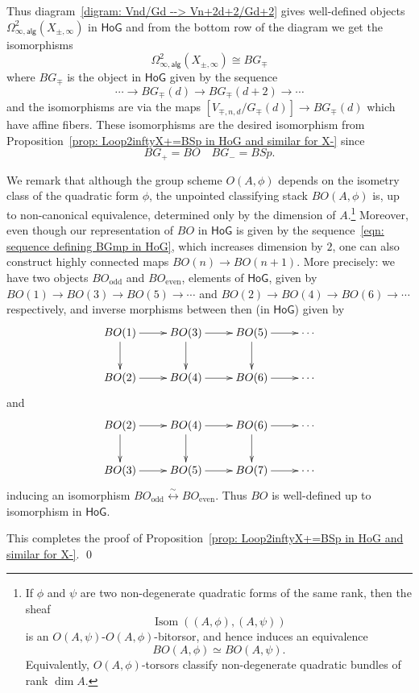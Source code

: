 \documentclass{amsart}
\theoremstyle{definition}
\newcommand{\kk} {{\mathbbm k}}
\newcommand{\HoG}{\textsf{HoG}}
\newcommand{\Isom}{\operatorname{Isom}}
\newcommand{\alg}{\mathsf{alg}}
\begin{document}
Thus diagram~\eqref{digram: Vnd/Gd --> Vn+2d+2/Gd+2} gives
well-defined objects $\Omega^{2}_{\infty ,\alg }(X_{\pm 
,\infty})$ in $\HoG$ and from the bottom row of the diagram we get the
isomorphisms
\[
\Omega^{2}_{\infty ,\alg }(X_{\pm,\infty}) \cong BG_{\mp} 
\]
where $BG_{\mp}$ is the object in $\HoG$ given by the sequence
\begin{equation}\label{eqn: sequence defining BGmp in HoG}
\dotsb \to BG_{\mp}(d)\to BG_{\mp}(d+2) \to \dotsb 
\end{equation}
and the isomorphisms are via the maps $\left[V_{\mp ,n,d}/G_{\mp}(d)
\right]\to BG_{\mp}(d)$ which have affine fibers. These isomorphisms
are the desired isomorphism from Proposition~\ref{prop:
Loop2inftyX+=BSp in HoG and similar for X-} since
\[
BG_{+}=BO \quad  BG_{-}=BSp.
\]

We remark that although the group scheme $O(A,\phi)$ depends on the
isometry class of the quadratic form $\phi$, the unpointed
classifying stack $BO(A,\phi)$ is, up to non-canonical equivalence,
determined only by the dimension of $A$.\footnote{If $\phi$ and $\psi$ are two
non-degenerate quadratic forms of the same rank, then the sheaf
\[
\Isom((A,\phi),(A,\psi))
\]
is an $O(A,\psi)$-$O(A,\phi)$-bitorsor, and hence induces an
equivalence
\[
BO(A,\phi)\simeq BO(A,\psi).
\]
Equivalently, $O(A,\phi)$-torsors classify non-degenerate quadratic
bundles of rank $\dim A$.}
Moreover, even though our representation of $BO$ in $\HoG$ is given
by the sequence~\eqref{eqn: sequence defining BGmp in HoG}, which
increases dimension by $2$, one can also construct highly connected
maps $BO(n)\to BO(n+1)$.
More precisely:  we have two objects $BO_{\text{odd}}$ and $BO_{\text{even}}$, elements of $\HoG$,
given by $BO(1) \rightarrow BO(3) \rightarrow BO(5) \rightarrow \cdots$ and
$BO(2) \rightarrow BO(4) \rightarrow BO(6) \rightarrow \cdots$ respectively, and inverse
morphisms between then (in $\HoG$) given by
$$
\xymatrix{
  BO(1) \ar[r] \ar[d] & BO(3) \ar[r] \ar[d] & BO(5) \ar[r] \ar[d] & \cdots \\
  BO(2) \ar[r]  & BO(4) \ar[r]  & BO(6) \ar[r]  & \cdots}
$$
and
$$
\xymatrix{
  BO(2) \ar[r] \ar[d] & BO(4) \ar[r] \ar[d] & BO(6) \ar[r] \ar[d] & \cdots \\
  BO(3) \ar[r]  & BO(5) \ar[r]  & BO(7) \ar[r]  & \cdots}
$$
inducing an isomorphism $BO_{\text{odd}} \overset \sim \longleftrightarrow BO_{\text{even}}$.
Thus $BO$ is well-defined up to isomorphism
in $\HoG$.

This completes the proof of Proposition~\ref{prop: Loop2inftyX+=BSp in
HoG and similar for X-}. \qed 

       


\end{document}
